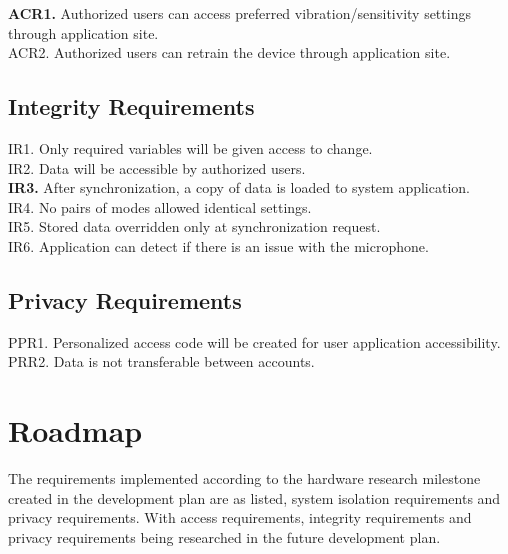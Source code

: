 \documentclass{article}
\begin{document}
\textbf{ACR1.} Authorized users can access preferred vibration/sensitivity settings through application site.
\\ACR2. Authorized users can retrain the device through application site. 

\subsection{Integrity Requirements}

IR1. Only required variables will be given access to change.
\\IR2. Data will be accessible by authorized users.
\\\textbf{IR3.} After synchronization, a copy of data is loaded to system application.  
\\IR4. No pairs of modes allowed identical settings.
\\IR5. Stored data overridden only at synchronization request.
\\IR6. Application can detect if there is an issue with the microphone.

\subsection{Privacy Requirements}

PPR1. Personalized access code will be created for user application accessibility. 
\\PRR2. Data is not transferable between accounts.


\section{Roadmap}

The requirements implemented according to the hardware research milestone created in the development plan are as listed, system isolation requirements and privacy requirements. With access requirements, integrity requirements and privacy requirements being researched in the future development plan.
\end{document}
